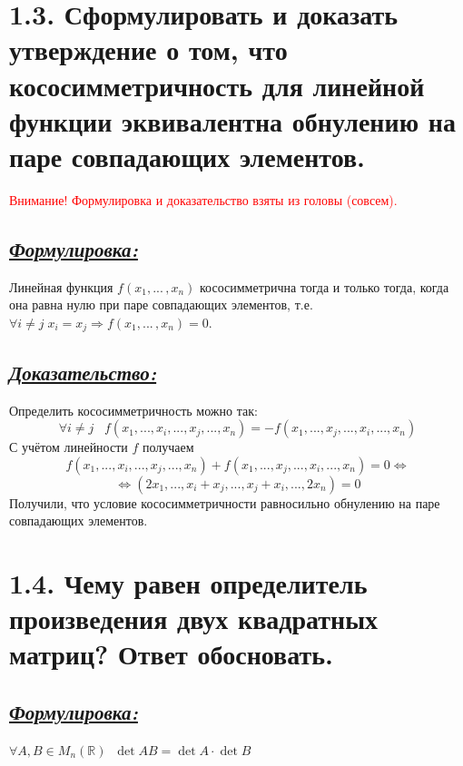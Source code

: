 \documentclass{article}
\begin{document}
\section*{\LARGE 1.3. Сформулировать и доказать утверждение о том, что кососимметричность для линейной функции эквивалентна обнулению на паре совпадающих элементов. }
\textcolor{red}{Внимание! Формулировка и доказательство взяты из головы (совсем). }
\subsection*{\Large \underline{\textit{Формулировка: }}}
Линейная функция $f(x_1, ...\,, x_n)$ кососимметрична тогда и только тогда, когда она равна нулю при паре совпадающих элементов, т.е. $\forall i \ne j \; x_i = x_j \Rightarrow f(x_1, ...\,, x_n) = 0$.

\subsection*{\Large \underline{\textit{Доказательство: }}}
Определить кососимметричность можно так:
$$ \forall i \ne j \;\;\; f(x_1, ..., x_i, ..., x_j, ..., x_n) = -f(x_1, ..., x_j, ..., x_i, ..., x_n) $$
С учётом линейности $f$ получаем
$$ f(x_1, ..., x_i, ..., x_j, ..., x_n) + f(x_1, ..., x_j, ..., x_i, ..., x_n) = 0  \Leftrightarrow$$
$$  \Leftrightarrow (2x_1, ..., x_i + x_j, ..., x_j + x_i, ..., 2x_n) = 0 $$
Получили, что условие кососимметричности равносильно обнулению на паре совпадающих элементов.

\section*{\LARGE 1.4. Чему равен определитель произведения двух квадратных матриц? Ответ обосновать. }
\subsection*{\Large \underline{\textit{Формулировка: }}}
$\forall A, B \in M_n(\mathbb{R}) \;\; \det{AB} = \det{A}\cdot\det{B}$
\end{document}
